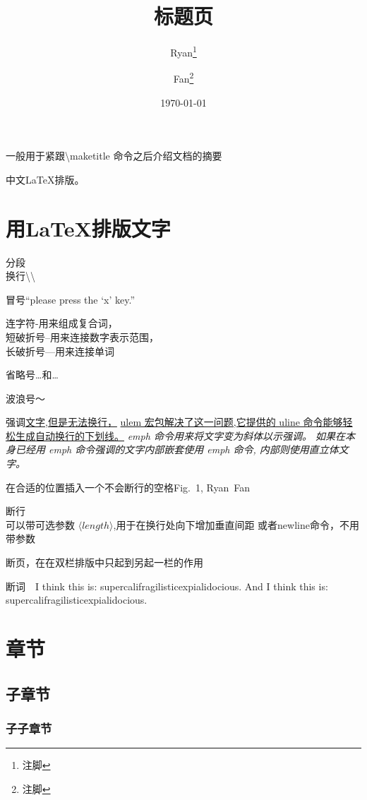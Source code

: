 \documentclass[a4paper]{ctexart}
\begin{document}
    \title{标题页}
    \author{Ryan\thanks{注脚}%
        \and Fan\thanks{注脚}%
        }
    \date{\today}
    \maketitle
    \abstract
    一般用于紧跟\textbackslash maketitle 命令之后介绍文档的摘要\par
    中文\LaTeX{}排版。
    \section{用\LaTeX 排版文字}
    {}分段\\换行\textbackslash\textbackslash\par
    冒号``please press the `x' key.''\par
    连字符-用来组成复合词，\\%
    短破折号--用来连接数字表示范围，\\%
    长破折号---用来连接单词\par
    省略号\dots{}和\ldots\par
    波浪号～\par
    强调\underline{文字,但是无法换行，}%
    \uline{ulem 宏包解决了这一问题,它提供的 uline 命令能够轻松生成自动换行的下划线。}%
    \emph{emph 命令用来将文字变为斜体以示强调。%
        \emph{如果在本身已经用 emph 命令强调的文字内部嵌套使用 emph 命令,}%
        内部则使用直立体文字。%
        }\par
    在合适的位置插入一个不会断行的空格Fig.~1, Ryan~Fan\par
    断行\\[15pt]可以带可选参数 $\langle length\rangle$,用于在换行处向下增加垂直间距%
    \newline{}或者newline命令，不用带参数\par
    \newpage 断页，在在双栏排版中只起到另起一栏的作用\par
    断词　I think this is: supercalifragil\-isticexpialidocious. %
    And I think this is: supercalifragilisticexpialidocious.\par
    \newpage
    \tableofcontents
    \section[目录和页眉页脚]{章节}
    \subsection{子章节}
    \subsubsection{子子章节}
\end{document}

